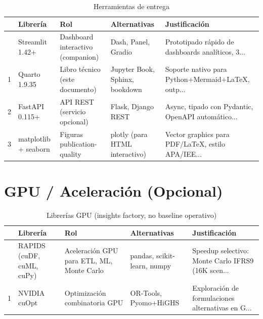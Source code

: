 \documentclass[
  spanish,
  11pt,
  letterpaper,
]{scrbook}
\theoremstyle{plain}
\theoremstyle{remark}
\begin{document}
{

\begin{longtable}[]{@{}lllll@{}}

\caption{\label{tbl-delivery-stack}Herramientas de entrega}

\tabularnewline

\toprule\noalign{}
& Librería & Rol & Alternativas & Justificación \\
\midrule\noalign{}
\endhead
\bottomrule\noalign{}
\endlastfoot
0 & Streamlit 1.42+ & Dashboard interactivo (companion) & Dash, Panel,
Gradio & Prototipado rápido de dashboards analíticos, 3... \\
1 & Quarto 1.9.35 & Libro técnico (este documento) & Jupyter Book,
Sphinx, bookdown & Soporte nativo para Python+Mermaid+LaTeX, outp... \\
2 & FastAPI 0.115+ & API REST (servicio opcional) & Flask, Django REST &
Async, tipado con Pydantic, OpenAPI automático... \\
3 & matplotlib + seaborn & Figuras publication-quality & plotly (para
HTML interactivo) & Vector graphics para PDF/LaTeX, estilo APA/IEE... \\

\end{longtable}

}

\section{GPU / Aceleración
(Opcional)}\label{gpu-aceleraciuxf3n-opcional}

{

\begin{longtable}[]{@{}lllll@{}}

\caption{\label{tbl-gpu-stack}Librerías GPU (insights factory, no
baseline operativo)}

\tabularnewline

\toprule\noalign{}
& Librería & Rol & Alternativas & Justificación \\
\midrule\noalign{}
\endhead
\bottomrule\noalign{}
\endlastfoot
0 & RAPIDS (cuDF, cuML, cuPy) & Aceleración GPU para ETL, ML, Monte
Carlo & pandas, scikit-learn, numpy & Speedup selectivo: Monte Carlo
IFRS9 (16K scen... \\
1 & NVIDIA cuOpt & Optimización combinatoria GPU & OR-Tools, Pyomo+HiGHS
& Exploración de formulaciones alternativas en G... \\

\end{longtable}

}
\end{document}
